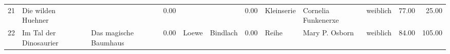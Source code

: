 \begin{table}
\begin{center}
{\begin{tabular}{rllrllrlllrr}
  21 & Die wilden Huehner                                                                                                                                                                                                                                              &                                                                                                                                                                                                                                                                 & 0.00 &                                                                                                                                                                                                                                                                 &                                                                                                                                                                                                                                                                 & 0.00 & Kleinserie & Cornelia Funkenerxe                                                                                                                                                                                                                                             & weiblich & 77.00 & 25.00 \\ 
  22 & Im Tal der Dinosaurier                                                                                                                                                                                                                                          & Das magische Baumhaus                                                                                                                                                                                                                                           & 0.00 & Loewe                                                                                                                                                                                                                                                           & Bindlach                                                                                                                                                                                                                                                        & 0.00 & Reihe & Mary P. Osborn                                                                                                                                                                                                                                                  & weiblich & 84.00 & 105.00 \\ 

\end{tabular}}
\end{center}
\end{table}
